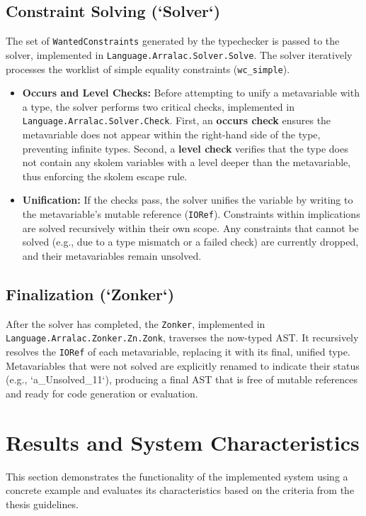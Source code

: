 \subsection{Constraint Solving (`Solver`)}
The set of \texttt{WantedConstraints} generated by the typechecker is passed to the solver, implemented in \texttt{Language.Arralac.Solver.Solve}. The solver iteratively processes the worklist of simple equality constraints (\texttt{wc\_simple}).
\begin{itemize}
  \item \textbf{Occurs and Level Checks:} Before attempting to unify a metavariable with a type, the solver performs two critical checks, implemented in \texttt{Language.Arralac.Solver.Check}. First, an \textbf{occurs check} ensures the metavariable does not appear within the right-hand side of the type, preventing infinite types. Second, a \textbf{level check} verifies that the type does not contain any skolem variables with a level deeper than the metavariable, thus enforcing the skolem escape rule.
  \item \textbf{Unification:} If the checks pass, the solver unifies the variable by writing to the metavariable's mutable reference (\texttt{IORef}). Constraints within implications are solved recursively within their own scope. Any constraints that cannot be solved (e.g., due to a type mismatch or a failed check) are currently dropped, and their metavariables remain unsolved.
\end{itemize}

\subsection{Finalization (`Zonker`)}
After the solver has completed, the \texttt{Zonker}, implemented in \texttt{Language.Arralac.Zonker.Zn.Zonk}, traverses the now-typed AST. It recursively resolves the \texttt{IORef} of each metavariable, replacing it with its final, unified type. Metavariables that were not solved are explicitly renamed to indicate their status (e.g., `a_Unsolved_11`), producing a final AST that is free of mutable references and ready for code generation or evaluation.

\section{Results and System Characteristics}
\label{sec:Implementation:Results}

This section demonstrates the functionality of the implemented system using a concrete example and evaluates its characteristics based on the criteria from the thesis guidelines.

